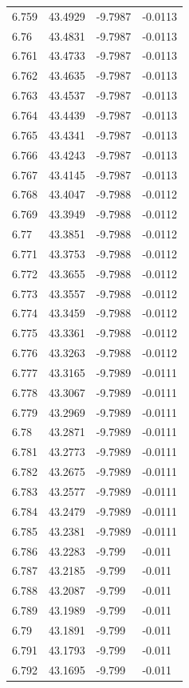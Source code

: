 \begin{tabular}{llll}
6.759 & 43.4929 & -9.7987 & -0.0113 \\
6.76 & 43.4831 & -9.7987 & -0.0113 \\
6.761 & 43.4733 & -9.7987 & -0.0113 \\
6.762 & 43.4635 & -9.7987 & -0.0113 \\
6.763 & 43.4537 & -9.7987 & -0.0113 \\
6.764 & 43.4439 & -9.7987 & -0.0113 \\
6.765 & 43.4341 & -9.7987 & -0.0113 \\
6.766 & 43.4243 & -9.7987 & -0.0113 \\
6.767 & 43.4145 & -9.7987 & -0.0113 \\
6.768 & 43.4047 & -9.7988 & -0.0112 \\
6.769 & 43.3949 & -9.7988 & -0.0112 \\
6.77 & 43.3851 & -9.7988 & -0.0112 \\
6.771 & 43.3753 & -9.7988 & -0.0112 \\
6.772 & 43.3655 & -9.7988 & -0.0112 \\
6.773 & 43.3557 & -9.7988 & -0.0112 \\
6.774 & 43.3459 & -9.7988 & -0.0112 \\
6.775 & 43.3361 & -9.7988 & -0.0112 \\
6.776 & 43.3263 & -9.7988 & -0.0112 \\
6.777 & 43.3165 & -9.7989 & -0.0111 \\
6.778 & 43.3067 & -9.7989 & -0.0111 \\
6.779 & 43.2969 & -9.7989 & -0.0111 \\
6.78 & 43.2871 & -9.7989 & -0.0111 \\
6.781 & 43.2773 & -9.7989 & -0.0111 \\
6.782 & 43.2675 & -9.7989 & -0.0111 \\
6.783 & 43.2577 & -9.7989 & -0.0111 \\
6.784 & 43.2479 & -9.7989 & -0.0111 \\
6.785 & 43.2381 & -9.7989 & -0.0111 \\
6.786 & 43.2283 & -9.799 & -0.011 \\
6.787 & 43.2185 & -9.799 & -0.011 \\
6.788 & 43.2087 & -9.799 & -0.011 \\
6.789 & 43.1989 & -9.799 & -0.011 \\
6.79 & 43.1891 & -9.799 & -0.011 \\
6.791 & 43.1793 & -9.799 & -0.011 \\
6.792 & 43.1695 & -9.799 & -0.011 \\

\end{tabular}
